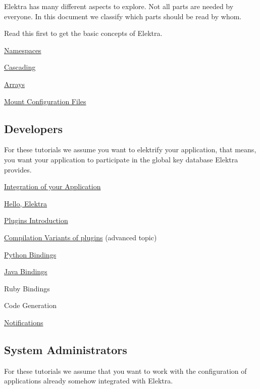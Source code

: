 Elektra has many different aspects to explore. Not all parts are needed by everyone. In this document we classify which parts should be read by whom.

Read this first to get the basic concepts of Elektra.


\begin{DoxyItemize}
\item \hyperlink{doc_tutorials_namespaces_md}{Namespaces}
\item \hyperlink{doc_tutorials_cascading_md}{Cascading}
\item \hyperlink{doc_tutorials_arrays_md}{Arrays}
\item \hyperlink{doc_tutorials_mount_md}{Mount Configuration Files}
\end{DoxyItemize}

\subsection*{Developers}

For these tutorials we assume you want to elektrify your application, that means, you want your application to participate in the global key database Elektra provides.


\begin{DoxyItemize}
\item \hyperlink{doc_tutorials_application-integration_md}{Integration of your Application}
\item \hyperlink{doc_tutorials_hello-elektra_md}{Hello, Elektra}
\item \hyperlink{doc_tutorials_plugins_md}{Plugins Introduction}
\item \hyperlink{doc_tutorials_compilation-variants_md}{Compilation Variants of plugins} (advanced topic)
\item \hyperlink{doc_tutorials_python-kdb_md}{Python Bindings}
\item \hyperlink{doc_tutorials_java-kdb_md}{Java Bindings}
\item Ruby Bindings
\item Code Generation
\item \hyperlink{doc_tutorials_notifications_md}{Notifications}
\end{DoxyItemize}

\subsection*{System Administrators}

For these tutorials we assume that you want to work with the configuration of applications already somehow integrated with Elektra.


